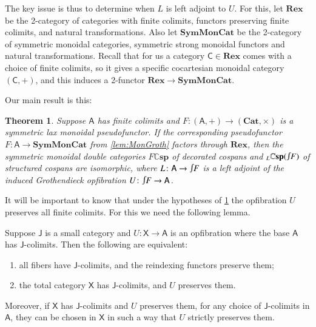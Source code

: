 \documentclass[reqno]{amsart}
\let\maps\colon
\newtheorem{thm}{Theorem}[section]
\theoremstyle{definition}
\theoremstyle{remark}
\newcommand{\A}{\mathsf{A}}
\newcommand{\C}{\mathsf{C}}
\newcommand{\J}{\mathsf{J}}
\newcommand{\X}{\mathsf{X}}
\newcommand{\bicat}{\mathbf}
\newcommand{\Cat}{\bicat{Cat}}
\newcommand{\Rex}{\bicat{Rex}}
\newcommand{\SMC}{\bicat{SymMonCat}}
\newcommand{\double}[1]{\mathbf{\mathbb #1}}
\newcommand{\lCsp}{\double{Csp}}
\newcommand{\inta}{\raisebox{.3\depth}{$\smallint\hspace{-.01in}$}}
\begin{document}
The key issue is thus to determine when $L$ is left adjoint to $U$.  For this, let $\Rex$ be the 2-category of categories with finite colimits, functors preserving finite colimits, and natural transformations.  Also let $\SMC$ be the 2-category of symmetric monoidal categories, symmetric strong monoidal functors and natural transformations.   Recall that for us a category $\C \in \Rex$ comes with a choice of finite colimits, so it gives a specific cocartesian monoidal category $(\C,+)$, and this induces a 2-functor $\Rex \to \SMC$.

Our main result is this:

\begin{thm} \label{thm:equiv}
Suppose $\A$ has finite colimits and $F \maps (\A,+) \to (\Cat,\times)$ is a symmetric lax monoidal pseudofunctor. If the corresponding pseudofunctor $F \maps \A \to \SMC$ from \cref{lem:MonGroth}
 factors through $\Rex$, then the symmetric monoidal double categories $F\lCsp$ of decorated cospans and ${}_L\lCsp(\inta F)$ of structured cospans are isomorphic, where $L \maps \A \to \inta F$ is a left adjoint of the induced Grothendieck opfibration $U \maps \inta F \to \A$.
\end{thm}

\iffalse
The 2-equivalence of \cref{lem:MonGroth} has an important special case where the Grothendieck category $(X,\otimes_\X)$ is cocartesian monoidal itself, with coproducts built up from \cref{eq:explicitstructure2}.  In that case, opfibrations $(\X,+) \to (\A,+)$ that strictly preserve coproducts and initial object bijectively correspond to pseudofunctors into the 2-category of cocartesian categories.  For more details, see \cite[Corollary 4.7]{MV} and the related discussion.
\fi

It will be important to know that under the hypotheses of \cref{thm:equiv} the opfibration $U$ preserves all finite colimits.   For this we need the following lemma.

\begin{lem} \label{lem:fibrewiselimits}
Suppose $\J$ is a small category and $U \maps \X \to \A$ is an opfibration where the base $\A$ has $\J$-colimits.  Then the following are equivalent:
\begin{enumerate}
 \item all fibers have $\J$-colimits, and the reindexing functors preserve them;
 \item the total category $\X$ has $\J$-colimits, and $U$ preserves them.
\end{enumerate}
Moreover, if $\X$ has $\J$-colimits and $U$ preserves them, for any choice of $\J$-colimits in $\A$, they can be chosen in $\X$ in such a way that $U$ strictly preserves them.   
\end{lem}
\end{document}
